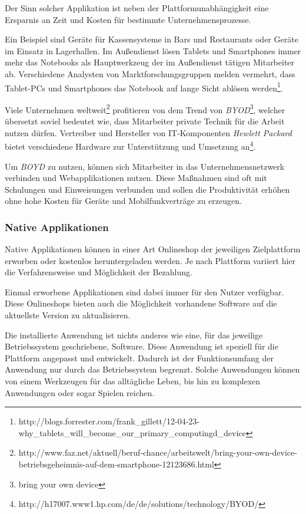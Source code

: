 Der Sinn solcher Applikation ist neben der Plattformunabhängigkeit eine Ersparnis an Zeit und Kosten für bestimmte Unternehmensprozesse.

Ein Beispiel sind Geräte für Kassensysteme in Bars und Restaurants oder Geräte im Einsatz in Lagerhallen. Im Außendienst lösen Tablets und Smartphones immer mehr das Notebooks als Hauptwerkzeug der im Außendienst tätigen Mitarbeiter ab. Verschiedene Analysten von Marktforschungsgruppen melden vermehrt, dass Tablet-PCs und Smartphones das Notebook auf lange Sicht ablösen werden\footnote{http://blogs.forrester.com/frank\_gillett/12-04-23-why\_tablets\_will\_become\_our\_primary\_computingd\_device}.

Viele Unternehmen weltweit\footnote{http://www.faz.net/aktuell/beruf-chance/arbeitswelt/bring-your-own-device-betriebsgeheimnis-auf-dem-smartphone-12123686.html} profitieren von dem Trend von \textit{BYOD}\footnote{bring your own device}, welcher übersetzt soviel bedeutet wie, dass Mitarbeiter private Technik für die Arbeit nutzen dürfen. Vertreiber und Hersteller von IT-Komponenten \emph{Hewlett Packard} bietet verschiedene Hardware zur Unterstützung und Umsetzung an\footnote{http://h17007.www1.hp.com/de/de/solutions/technology/BYOD/}.

 Um \textit{BOYD} zu nutzen, können sich Mitarbeiter in das Unternehmensnetzwerk verbinden und Webapplikationen nutzen. Diese Maßnahmen sind oft mit Schulungen und Einweisungen verbunden und sollen die Produktivität erhöhen ohne hohe Kosten für Geräte und Mobilfunkverträge zu erzeugen.

\subsubsection{Native Applikationen}
\label{natand}

Native Applikationen können in einer Art Onlineshop der jeweiligen Zielplattform erworben oder kostenlos heruntergeladen werden. Je nach Plattform variiert hier die Verfahrensweise und Möglichkeit der Bezahlung.

Einmal erworbene Applikationen sind dabei immer für den Nutzer verfügbar. Diese Onlineshops bieten auch die Möglichkeit vorhandene Software auf die aktuellste Version zu aktualisieren.

Die installierte Anwendung ist nichts anderes wie eine, für das jeweilige Betriebssystem geschriebene, Software. Diese Anwendung ist speziell für die Plattform angepasst und entwickelt. Dadurch ist der Funktionsumfang der Anwendung nur durch das Betriebssystem begrenzt. Solche Anwendungen können von einem Werkzeugen für das alltägliche Leben, bis hin zu komplexen Anwendungen oder sogar Spielen reichen.

